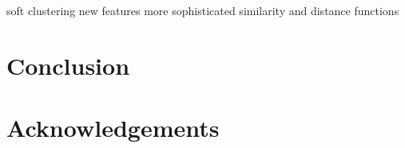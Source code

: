 \documentclass[conference]{IEEEtran}
\begin{document}
soft clustering
new features
more sophisticated similarity and distance functions

\section{Conclusion}


\section{Acknowledgements}
\end{document}
